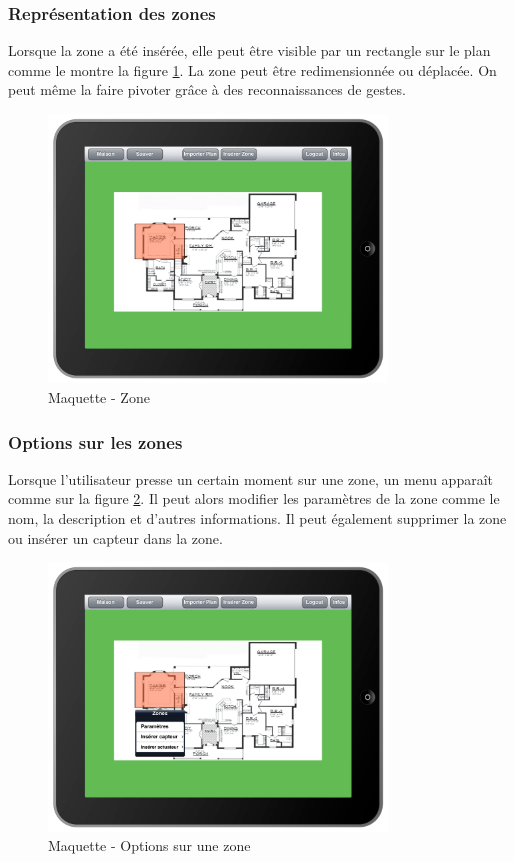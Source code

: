 \subsubsection{Représentation des zones}
Lorsque la zone a été insérée, elle peut être visible par un rectangle sur le plan comme le montre la figure \ref{gra:maq08}. La zone peut être redimensionnée ou déplacée. On peut même la faire pivoter grâce à des reconnaissances de gestes.

\begin{figure}[H]
      \centering
      \includegraphics[width=9cm]{00_media/04_Maquette_08.pdf}
      \caption{Maquette - Zone}
      \label{gra:maq08}
\end{figure}
\subsubsection{Options sur les zones}
Lorsque l'utilisateur presse un certain moment sur une zone, un menu apparaît comme sur la figure \ref{gra:maq09}. Il peut alors modifier les paramètres de la zone comme le nom, la description et d'autres informations. Il peut également supprimer la zone ou insérer un capteur dans la zone.
\begin{figure}[H]
      \centering
      \includegraphics[width=9cm]{00_media/04_Maquette_09.pdf}
      \caption{Maquette - Options sur une zone}
      \label{gra:maq09}
\end{figure}
